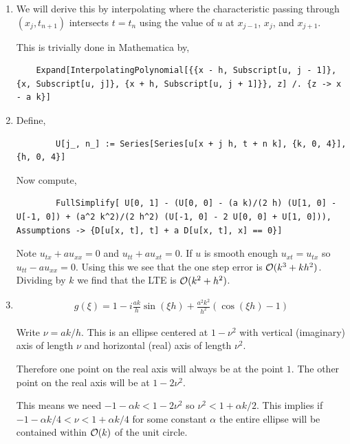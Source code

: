 \documentclass[10pt]{article}
\begin{document}
\begin{solution}[Solution]
\begin{enumerate}[label=(\alph*)]
    \item We will derive this by interpolating where the characteristic passing through \( (x_j,t_{n+1}) \) intersects \( t=t_n \) using the value of \( u \) at  \( x_{j-1} \), \( x_j \), and \( x_{j+1} \).

    This is trivially done in Mathematica by,
    \begin{lstlisting}
    Expand[InterpolatingPolynomial[{{x - h, Subscript[u, j - 1]}, {x, Subscript[u, j]}, {x + h, Subscript[u, j + 1]}}, z] /. {z -> x - a k}] 
    \end{lstlisting}
 
    \item 
    Define,
    \begin{lstlisting}
        U[j_, n_] := Series[Series[u[x + j h, t + n k], {k, 0, 4}], {h, 0, 4}]
    \end{lstlisting}
    
    Now compute,
    \begin{lstlisting}
        FullSimplify[ U[0, 1] - (U[0, 0] - (a k)/(2 h) (U[1, 0] - U[-1, 0]) + (a^2 k^2)/(2 h^2) (U[-1, 0] - 2 U[0, 0] + U[1, 0])), Assumptions -> {D[u[x, t], t] + a D[u[x, t], x] == 0}]
    \end{lstlisting}
    
        Note \( u_{tx}+au_{xx} = 0 \) and \( u_{tt} + au_{xt} = 0 \). If \( u \) is smooth enough \( u_{xt} = u_{tx} \) so \( u_{tt} - au_{xx} = 0 \). Using this we see that the one step error is \( \mathcal{O}(k^3 + kh^2) \). Dividing by \( k \) we find that the LTE is \( \mathcal{O}(k^2+h^2) \). 

    \item
       \begin{align*}
           g(\xi) = 1 - i\frac{ak}{h}\sin(\xi h) + \frac{a^2k^2}{h^2}(\cos(\xi h) - 1)
       \end{align*}
       
        Write \( \nu = ak/h \). This is an ellipse centered at \( 1-\nu^2 \) with vertical (imaginary) axis of length \( \nu \) and horizontal (real) axis of length \( \nu^2 \).

        Therefore one point on the real axis will always be at the point \( 1 \). The other point on the real axis will be at \( 1-2\nu^2 \).

        This means we need \( -1 - \alpha k < 1-2\nu^2 \) so \( \nu^2 < 1 + \alpha k/2 \). This implies if \( -1-\alpha k/4 < \nu < 1 + \alpha k/4 \) for some constant \( \alpha \) the entire ellipse will be contained within \( \mathcal{O}(k) \) of the unit circle.
        



\end{enumerate}
\end{solution}
\end{document}
